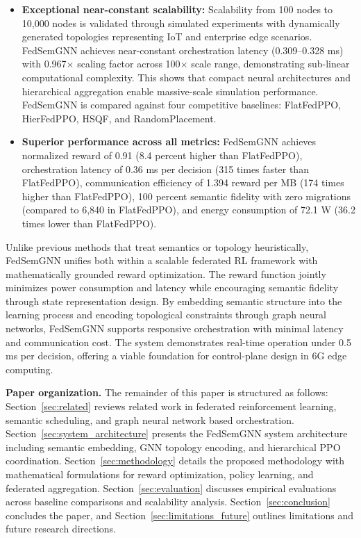 \documentclass[conference]{IEEEtran}
\begin{document}
\begin{itemize}
			\item \textbf{Exceptional near-constant scalability:} Scalability from 100 nodes to 10,000 nodes is validated through simulated experiments with dynamically generated topologies representing IoT and enterprise edge scenarios. FedSemGNN achieves near-constant orchestration latency (0.309--0.328 ms) with 0.967$\times$ scaling factor across 100$\times$ scale range, demonstrating sub-linear computational complexity. This shows that compact neural architectures and hierarchical aggregation enable massive-scale simulation performance. FedSemGNN is compared against four competitive baselines: FlatFedPPO, HierFedPPO, HSQF, and RandomPlacement.
			
			\item \textbf{Superior performance across all metrics:} FedSemGNN achieves normalized reward of 0.91 (8.4 percent higher than FlatFedPPO), orchestration latency of 0.36 ms per decision (315 times faster than FlatFedPPO), communication efficiency of 1.394 reward per MB (174 times higher than FlatFedPPO), 100 percent semantic fidelity with zero migrations (compared to 6,840 in FlatFedPPO), and energy consumption of 72.1 W (36.2 times lower than FlatFedPPO).
		\end{itemize}
		
		Unlike previous methods that treat semantics or topology heuristically, FedSemGNN unifies both within a scalable federated RL framework with mathematically grounded reward optimization. The reward function jointly minimizes power consumption and latency while encouraging semantic fidelity through state representation design. By embedding semantic structure into the learning process and encoding topological constraints through graph neural networks, FedSemGNN supports responsive orchestration with minimal latency and communication cost. The system demonstrates real-time operation under 0.5 ms per decision, offering a viable foundation for control-plane design in 6G edge computing.
		
		\noindent\textbf{Paper organization.} The remainder of this paper is structured as follows: Section~\ref{sec:related} reviews related work in federated reinforcement learning, semantic scheduling, and graph neural network based orchestration. Section~\ref{sec:system_architecture} presents the FedSemGNN system architecture including semantic embedding, GNN topology encoding, and hierarchical PPO coordination. Section~\ref{sec:methodology} details the proposed methodology with mathematical formulations for reward optimization, policy learning, and federated aggregation. Section~\ref{sec:evaluation} discusses empirical evaluations across baseline comparisons and scalability analysis. Section~\ref{sec:conclusion} concludes the paper, and Section~\ref{sec:limitations_future} outlines limitations and future research directions.
		
\end{document}
